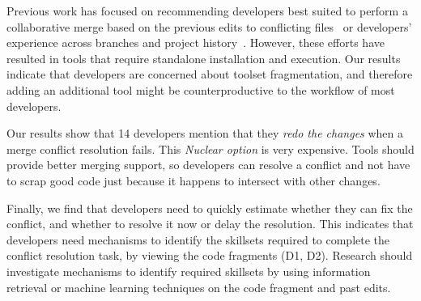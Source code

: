 Previous work has focused on recommending developers best suited to perform a collaborative merge based on the previous edits to conflicting files~\cite{dasilva2015niche} or developers' experience across branches and project history~\cite{CostaSarma}. 
However, these efforts have resulted in tools that require standalone installation and execution. 
Our results indicate that developers are concerned about toolset fragmentation, and therefore adding an additional tool might be counterproductive to the workflow of most developers. 

Our results show that 14 developers mention that they \emph{redo the changes} when a merge conflict resolution fails.
This \emph{Nuclear option} is very expensive.
Tools should provide better merging support, so developers can resolve a conflict and not have to scrap good code just because it happens to intersect with other changes.

Finally, we find that developers need to quickly estimate whether they can fix the conflict, and whether to resolve it now or delay the resolution. 
This indicates that developers need mechanisms to identify the skillsets required to complete the conflict resolution task, by viewing the code fragments (D1, D2).
Research should investigate mechanisms to identify required skillsets by using information retrieval or machine learning techniques on the code fragment and past edits.
